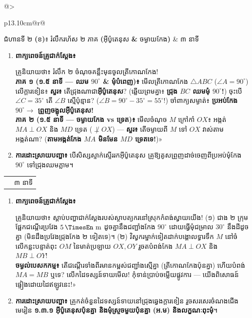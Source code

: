 \documentclass[a4paper,12pt]{article}
\makeatletter
\newcommand{\en}[1]{{\TimesEn #1}}
\newcommand{\enbf}[1]{{\TimesEn\textbf{#1}}}
\newcommand{\unit}[1]{\,\text{\en{#1}}}
\newcommand{\tri}[1]{\ensuremath{\triangle #1}}
\newcommand{\ang}[1]{\ensuremath{\angle #1}}
\newenvironment{phasebox}[3]{%
  \par\needspace{2.4cm}%
  \begin{tcolorbox}[
    enhanced, sharp corners, colback=headgray, colframe=black,
    boxrule=1.0pt, top=3.5pt, bottom=3.5pt, left=8pt, right=8pt,
    before skip=5pt, after skip=3pt
  ]
    \linespread{1.0}\selectfont\renewcommand{\arraystretch}{1.0}%
    \begin{tabular*}{\linewidth}{@{}>{\raggedright\arraybackslash}p{13.10cm}@{\extracolsep{\fill}}r@{}}
      {\muol\fontsize{11pt}{14.5pt}\selectfont #1} & {\fontsize{10.5pt}{13.5pt}\selectfont\en{#2 |} #3}%
    \end{tabular*}%
  \end{tcolorbox}%
  \begingroup\fontsize{11.5pt}{14.92pt}\selectfont
}{%
  \par\endgroup
  \vspace{3pt}{\color{black}\hrule height 0.75pt}\vspace{5pt}%
}
\makeatother
\begin{document}
\begin{phasebox}{ជំហានទី ២ \enbf{(}ខ\enbf{)}៖ រំលឹករហ័ស ២ ភាគ \enbf{(}អ៊ីប៉ូតេនុស \enbf{\&} ចម្ងាយកែង\enbf{)}}{05--08 min}{៣ នាទី}
  \begin{enumerate}[leftmargin=0.45cm, topsep=1.5pt, itemsep=2.2pt, parsep=0pt]
    \item \textbf{ពាក្យពេចន៍គ្រូជាក់ស្ដែង៖}
      \begin{scriptbox}
        {\muol\fontsize{10.8pt}{14.5pt}\selectfont \enbf{«}គ្រូនិយាយថា៖} រំលឹក ២ ចំណុចគន្លឹះមុនចូលត្រីកោណកែង!\\
        \textbf{ភាគ ១ (១.៥ នាទី — ឈម $90^\circ$ \& មុំបំពេញ)៖} មើលត្រីកោណកែង $\tri{ABC}$ ($\ang{A}=90^\circ$) លើក្ដារខៀន៖ \textbf{សួរ៖} តើជ្រុងណាជា\textbf{អ៊ីប៉ូតេនុស}? (ឆ្លើយព្រមគ្នា៖ \textbf{ជ្រុង $BC$ ឈមមុំ $90^\circ$!}) ចុះបើ $\ang{C}=35^\circ$ តើ $\ang{B}$ ស្មើប៉ុន្មាន? ($\ang{B}=90^\circ - 35^\circ = 55^\circ$!) ចាំពាក្យសម្ងាត់៖ \textbf{ប្រអប់កែង $90^\circ \to$ ព្រួញចង្អុលអ៊ីប៉ូតេនុស!}\\
        \textbf{ភាគ ២ (១.៥ នាទី — ចម្ងាយកែង vs ទ្រេត)៖} មើលចំណុច $M$ ក្រៅកាំ $OX$៖ អង្កត់ $MA \perp OX$ និង $MD$ ទ្រេត ($\not\perp OX$) — \textbf{សួរ៖} តើចម្ងាយពី $M$ ទៅ $OX$ វាស់តាមអង្កត់ណា? (\textbf{តាមអង្កត់កែង $MA$ មិនមែន $MD$ ទ្រេតទេ!})»
      \end{scriptbox}
    \item \textbf{ការដោះស្រាយបញ្ហា៖} បើសិស្សស្ទាក់ស្ទើររកអ៊ីប៉ូតេនុស គ្រូឱ្យគូសព្រួញដាច់ចេញពីប្រអប់មុំកែង $90^\circ$ ទៅជ្រុងឈមភ្លាម។
  \end{enumerate}
\end{phasebox}

\begin{phasebox}{ជំហានទី ២ \enbf{(}គ\enbf{) --- E1 Engage}៖ ជម្រាលជណ្ដើរសុវត្ថិភាព \enbf{\&} ទ្វារទឹក}{08--11 min}{៣ នាទី}
  \begin{enumerate}[leftmargin=0.45cm, topsep=1.5pt, itemsep=2.2pt, parsep=0pt]
    \item \textbf{ពាក្យពេចន៍គ្រូជាក់ស្ដែង៖}
      \begin{scriptbox}
        {\muol\fontsize{10.8pt}{14.5pt}\selectfont \enbf{«}គ្រូនិយាយថា៖} ស្ដាប់បញ្ហាជាក់ស្ដែងរបស់ស្ថាបត្យករនៅស្រុកកំពង់ស្វាយយើង! (១) ជាង ២ ក្រុមផ្អែកជណ្ដើរប្រវែង \textbf{$5\unit{m}$} ដូចគ្នានឹងជញ្ជាំងកែង \textbf{$90^\circ$} ដោយធ្វើមុំជម្រាល \textbf{$30^\circ$} នឹងដីដូចគ្នា (មិនដឹងប្រវែងជ្រុងកែង ២ ទៀតទេ)។ (២) វិស្វករម្នាក់ទៀតដាក់បង្គោលទ្វារទឹក $M$ នៅចំលើកន្លះបន្ទាត់ពុះ $OM$ នៃមាត់ប្រឡាយ $OX, OY$ រួចតបំពង់កែង $MA\perp OX$ និង $MB\perp OY$!\\
        \textbf{ចម្ងល់បេសកកម្ម៖} តើជណ្ដើរទាំងពីរមានកម្ពស់ជញ្ជាំងស្មើគ្នា (ត្រីកោណកែងប៉ុនគ្នា) ហើយបំពង់ $MA = MB$ ឬទេ? លើកដៃទស្សន៍ទាយមើល! កុំទាន់ប្រាប់ចម្លើយផ្លូវការ — យើងពិសោធន៍ផ្ទៀងដោយដៃឥឡូវនេះ!»
      \end{scriptbox}
    \item \textbf{ការដោះស្រាយបញ្ហា៖} គ្រូកត់ចំនួនដៃទស្សន៍ទាយនៅជ្រុងឆ្វេងក្ដារខៀន រួចសរសេរចំណងជើងមេរៀន \textbf{១.៣.១ អ៊ីប៉ូតេនុសប៉ុនគ្នា និងមុំស្រួចមួយប៉ុនគ្នា (អ.ម) និងលក្ខណៈពុះមុំ}។
  \end{enumerate}
\end{phasebox}
\end{document}
